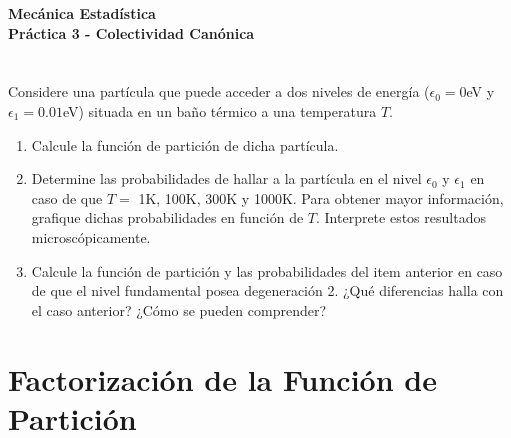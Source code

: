 \documentclass[a4paper,11pt]{article}
\begin{document}
\pagestyle{fancy}
\chead{\small \the\year}



\thispagestyle{plain}
\begin{center}
    \textbf{\large
        Mecánica Estadística \\
        Práctica 3 - Colectividad Canónica
    }
\end{center}
\vspace{-1.5em}




\section{}

Considere una partícula que puede acceder a dos niveles de energía ($\epsilon_0 = 0$eV
y $\epsilon_1 = 0.01$eV) situada en un baño térmico a una temperatura $T$.

\begin{enumerate}[label=(\alph*),
                  leftmargin=2\parindent,
                  rightmargin=2\parindent]

    \item{Calcule la función de partición de dicha partícula.}

    \item{Determine las probabilidades de hallar a la partícula en el nivel $\epsilon_0$
          y $\epsilon_1$ en caso de que $T =$ 1K, 100K, 300K y 1000K.
          Para obtener mayor información, grafique dichas probabilidades en función de
          $T$.
          Interprete estos resultados microscópicamente.}

    \item{Calcule la función de partición y las probabilidades del item anterior en caso
          de que el nivel fundamental posea degeneración 2.
          ¿Qué diferencias halla con el caso anterior? ¿Cómo se pueden comprender?}

\end{enumerate}

\section{Factorización de la Función de Partición}
\end{document}

